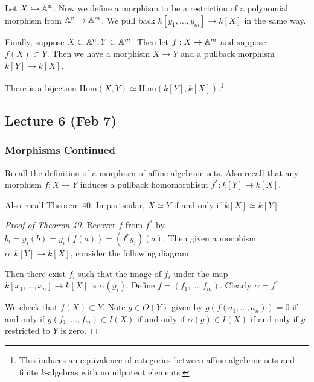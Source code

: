 \documentclass[twoside, 10pt]{article}
\begin{document}
    Let $X \hookrightarrow \mathbb{A}^n$. Now we define a morphism to be a restriction of a polynomial morphism from $\mathbb{A}^n \rightarrow \mathbb{A}^m$. We pull back $k[y_1, \ldots, y_m] \rightarrow k[X]$ in the same way.

    Finally, suppose $X \subset \mathbb{A}^n, Y \subset \mathbb{A}^m$. Then let $f:X \rightarrow \mathbb{A}^m$ and suppose $f(X) \subset Y$. Then we have a morphism $X \rightarrow Y$ and a pullback morphism $k[Y] \rightarrow k[X]$.

    \begin{thm}
        There is a bijection $\mathrm{Hom}(X,Y) \simeq \mathrm{Hom}(k[Y], k[X])$.\footnote{This induces an equivalence of categories between affine algebraic sets and finite $k$-algebras with no nilpotent elements.}
    \end{thm}

    \subsection{Lecture 6 (Feb 7)}

    \subsubsection{Morphisms Continued}
    Recall the definition of a morphism of affine algebraic sets. Also recall that any morphism $f : X \rightarrow Y$ induces a pullback homomorphism $f^*: k[Y] \rightarrow k[X]$.
    
    Also recall Theorem 40. In particular, $X \simeq Y$ if and only if $k[X] \simeq k[Y]$.

    \begin{proof}[Proof of Theorem 40]
        Recover $f$ from $f^*$ by $b_i = y_i(b) = y_i(f(a)) = (f^*y_i)(a)$. Then given a morphism $\alpha: k[Y] \rightarrow k[X]$, consider the following diagram.

        \begin{center}
        \end{center}

        Then there exist $f_i$ such that the image of $f_i$ under the map $k[x_1, \ldots, x_n] \rightarrow k[X]$ is $\alpha(y_i)$. Define $f = (f_1, \ldots, f_m)$. Clearly $\alpha = f^*$. 

        We check that $f(X) \subset Y$. Note $g \in O(Y)$ given by $g(f(a_1, \ldots, a_n)) = 0$ if and only if $g(f_1, \ldots, f_m) \in I(X)$ if and only if $\alpha(g) \in I(X)$ if and only if $g$ restricted to $Y$ is zero.
    \end{proof}
\end{document}
